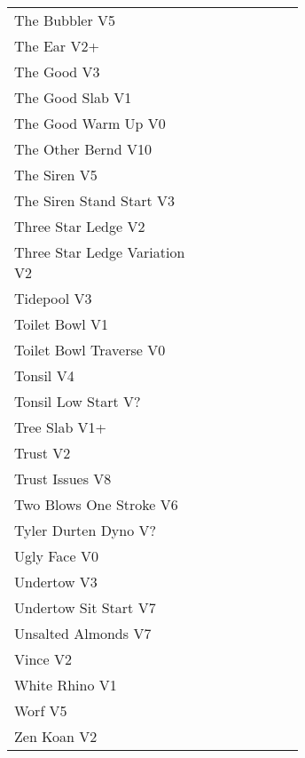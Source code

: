 \begin{flushleft}
\begin{center}
\begin{supertabular}{p{0.65\linewidth}r}
The Bubbler V5 & \pageref{rt:The Bubbler} \\
The Ear V2+ & \pageref{rt:The Ear} \\
The Good V3 & \pageref{rt:The Good} \\
The Good Slab V1 & \pageref{rt:The Good Slab} \\
The Good Warm Up V0 & \pageref{rt:The Good Warm Up} \\
The Other Bernd V10 & \pageref{rt:The Other Bernd} \\
The Siren V5 & \pageref{rt:The Siren} \\
The Siren Stand Start V3 & \pageref{vr:The Siren Stand Start} \\
Three Star Ledge V2 & \pageref{rt:Three Star Ledge} \\
Three Star Ledge Variation V2 & \pageref{vr:Three Star Ledge Variation} \\
Tidepool V3 & \pageref{rt:Tidepool} \\
Toilet Bowl V1 & \pageref{rt:Toilet Bowl} \\
Toilet Bowl Traverse V0 & \pageref{rt:Toilet Bowl Traverse} \\
Tonsil V4 & \pageref{rt:Tonsil} \\
Tonsil Low Start V? & \pageref{vr:Tonsil Low Start} \\
Tree Slab V1+ & \pageref{rt:Tree Slab} \\
Trust V2 & \pageref{rt:Trust} \\
Trust Issues V8 & \pageref{rt:Trust Issues} \\
Two Blows One Stroke V6 & \pageref{rt:Two Blows One Stroke} \\
Tyler Durten Dyno V? & \pageref{vr:Tyler Durten Dyno} \\
Ugly Face V0 & \pageref{rt:Ugly Face} \\
Undertow V3 & \pageref{rt:Undertow} \\
Undertow Sit Start V7 & \pageref{vr:Undertow Sit Start} \\
Unsalted Almonds V7 & \pageref{rt:Unsalted Almonds} \\
Vince V2 & \pageref{rt:Vince} \\
White Rhino V1 & \pageref{rt:White Rhino} \\
Worf V5 & \pageref{rt:Worf} \\
Zen Koan V2 & \pageref{rt:Zen Koan} \\
\end{supertabular}
\end{center}

\end{flushleft}
